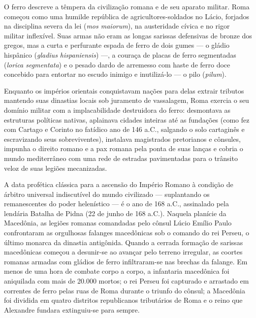 O ferro descreve a têmpera da civilização romana e de seu aparato militar. Roma começou como uma humilde república de agricultores-soldados no Lácio, forjados na disciplina severa da lei (\textit{mos maiorum}), na austeridade cívica e no rigor militar inflexível. Suas armas não eram as longas sarissas defensivas de bronze dos gregos, mas a curta e perfurante espada de ferro de dois gumes — o gládio hispânico (\textit{gladius hispaniensis}) —, a couraça de placas de ferro segmentadas (\textit{lorica segmentata}) e o pesado dardo de arremesso com haste de ferro doce concebido para entortar no escudo inimigo e inutilizá-lo — o pilo (\textit{pilum}).

Enquanto os impérios orientais conquistavam nações para delas extrair tributos mantendo suas dinastias locais sob juramento de vassalagem, Roma exercia o seu domínio militar com a implacabilidade destruidora do ferro: desmontava as estruturas políticas nativas, aplainava cidades inteiras até as fundações (como fez com Cartago e Corinto no fatídico ano de 146 a.C., salgando o solo cartaginês e escravizando seus sobreviventes), instalava magistrados pretorianos e cônsules, impunha o direito romano e a pax romana pela ponta de suas lanças e cobria o mundo mediterrâneo com uma rede de estradas pavimentadas para o trânsito veloz de suas legiões mecanizadas.

A data profética clássica para a ascensão do Império Romano à condição de árbitro universal indiscutível do mundo civilizado — suplantando os remanescentes do poder helenístico — é o ano de 168 a.C., assinalado pela lendária Batalha de Pidna (22 de junho de 168 a.C.). Naquela planície da Macedônia, as legiões romanas comandadas pelo cônsul Lúcio Emílio Paulo confrontaram as orgulhosas falanges macedônicas sob o comando do rei Perseu, o último monarca da dinastia antigônida. Quando a cerrada formação de sarissas macedônicas começou a desunir-se ao avançar pelo terreno irregular, as coortes romanas armadas com gládios de ferro infiltraram-se nas brechas da falange. Em menos de uma hora de combate corpo a corpo, a infantaria macedônica foi aniquilada com mais de 20.000 mortos; o rei Perseu foi capturado e arrastado em correntes de ferro pelas ruas de Roma durante o triunfo do cônsul; a Macedônia foi dividida em quatro distritos republicanos tributários de Roma e o reino que Alexandre fundara extinguiu-se para sempre.

